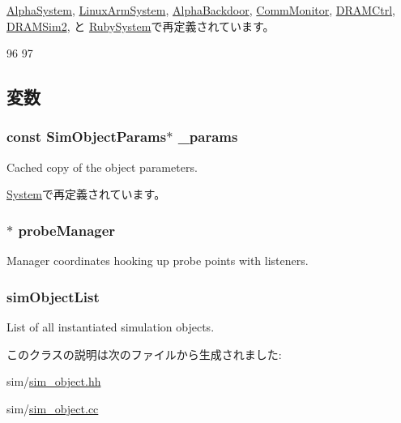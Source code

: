 \hyperlink{classAlphaSystem_aecc7d8debf54990ffeaaed5bac7d7d81}{AlphaSystem}, \hyperlink{classLinuxArmSystem_aecc7d8debf54990ffeaaed5bac7d7d81}{LinuxArmSystem}, \hyperlink{classAlphaBackdoor_aecc7d8debf54990ffeaaed5bac7d7d81}{AlphaBackdoor}, \hyperlink{classCommMonitor_aecc7d8debf54990ffeaaed5bac7d7d81}{CommMonitor}, \hyperlink{classDRAMCtrl_aecc7d8debf54990ffeaaed5bac7d7d81}{DRAMCtrl}, \hyperlink{classDRAMSim2_aecc7d8debf54990ffeaaed5bac7d7d81}{DRAMSim2}, と \hyperlink{classRubySystem_aecc7d8debf54990ffeaaed5bac7d7d81}{RubySystem}で再定義されています。


\begin{DoxyCode}
96 {
97 }
\end{DoxyCode}


\subsection{変数}
\hypertarget{classSimObject_acaf6024ae9dda44bfb1c67e05ad70aef}{
\subsubsection[{\_\-params}]{\setlength{\rightskip}{0pt plus 5cm}const SimObjectParams$\ast$ {\bf \_\-params}}}
\label{classSimObject_acaf6024ae9dda44bfb1c67e05ad70aef}
Cached copy of the object parameters. 

\hyperlink{classSystem_afb9ae78c3e2cd51a280162491c99366c}{System}で再定義されています。\hypertarget{classSimObject_a91f0eaabebee1e88aa1c502f3e44c9d1}{
\subsubsection[{probeManager}]{$\ast$ {\bf probeManager}}}
\label{classSimObject_a91f0eaabebee1e88aa1c502f3e44c9d1}
Manager coordinates hooking up probe points with listeners. \hypertarget{classSimObject_a7ff88c7f8734c4fdbb417055e69001c0}{
\subsubsection[{simObjectList}]{ {\bf simObjectList}}}
\label{classSimObject_a7ff88c7f8734c4fdbb417055e69001c0}
List of all instantiated simulation objects. 

このクラスの説明は次のファイルから生成されました:\begin{DoxyCompactItemize}
\item 
sim/\hyperlink{sim__object_8hh}{sim\_\-object.hh}\item 
sim/\hyperlink{sim__object_8cc}{sim\_\-object.cc}\end{DoxyCompactItemize}
